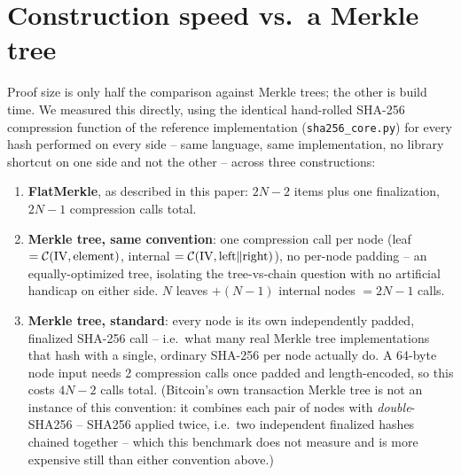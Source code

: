 \section{Construction speed vs.\ a Merkle tree}
\label{sec:benchmark}

Proof size is only half the comparison against Merkle trees; the other is
build time. We measured this directly, using the identical hand-rolled
SHA-256 compression function of the reference implementation
(\texttt{sha256\_core.py}) for every hash performed on every side --
same language, same implementation, no library shortcut on one side and not
the other -- across three constructions:

\begin{enumerate}
\item \textbf{FlatMerkle}, as described in this paper: $2N-2$ items plus one
  finalization, $2N-1$ compression calls total.
\item \textbf{Merkle tree, same convention}: one compression call per node
  (leaf $= \mathcal{C}(\mathrm{IV}, \text{element})$, internal $= \mathcal{C}(\mathrm{IV},
  \text{left} \Vert \text{right})$), no per-node padding -- an
  equally-optimized tree, isolating the tree-vs-chain question with no
  artificial handicap on either side. $N$ leaves $+ (N-1)$ internal nodes
  $= 2N-1$ calls.
\item \textbf{Merkle tree, standard}: every node is its own independently
  padded, finalized SHA-256 call -- i.e.\ what many real Merkle tree
  implementations that hash with a single, ordinary SHA-256 per node
  actually do. A 64-byte node input needs 2 compression calls once padded
  and length-encoded, so this costs $4N-2$ calls total. (Bitcoin's own
  transaction Merkle tree is not an instance of this convention: it
  combines each pair of nodes with \emph{double}-SHA256 -- SHA256 applied
  twice, i.e.\ two independent finalized hashes chained together -- which
  this benchmark does not measure and is more expensive still than either
  convention above.)
\end{enumerate}

